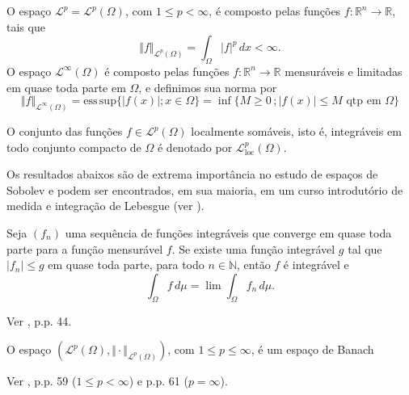 \documentclass[a4paper, 11pt]{book}
\theoremstyle{definition}
\newcommand{\bN}{\mathbb{N}}
\newcommand{\bR}{\mathbb{R}}
\newcommand{\cL}{\mathcal{L}}
\begin{document}
\begin{dbox}[Espaços $\cL^p$ e $\cL^\infty$]
    O espaço $\cL^p = \cL^p(\Omega)$, com $1 \leqslant p < \infty$, é composto pelas funções $f : \bR^n \to \bR$, tais que
    \[
        \Vert f \Vert_{\cL^p(\Omega)} = \int_\Omega |f|^p \, dx < \infty.
    \]
    O espaço $\cL^\infty(\Omega)$ é composto pelas funções $f : \bR^n \to \bR$ mensuráveis e limitadas em quase toda parte em $\Omega$, e definimos sua norma por
    \[
        \Vert f \Vert_{\cL^\infty(\Omega)} = \mathrm{ess\,sup} \{|f(x)|; x \in \Omega\} =\inf \{M \geqslant 0 \,; |f(x)| \leqslant M \text{ qtp em } \Omega\}
    \]
\end{dbox}

\begin{dbox}
    O conjunto das funções $f \in \cL^p(\Omega)$ localmente somáveis, isto é, integráveis em todo conjunto compacto de $\Omega$ é denotado por $\cL^p_{\mathrm{loc}}(\Omega)$.
\end{dbox}

Os resultados abaixos são de extrema importância no estudo de espaços de Sobolev e podem ser encontrados, em sua maioria, em um curso introdutório de medida e integração de Lebesgue (ver \cite{axler-measure.theory,bartle-measure.theory,folland-real.analysis}).

\begin{tbox} \label{thm:teorema-da-convergencia-dominada}
    Seja $(f_n)$ uma sequência de funções integráveis que converge em quase toda parte para a função mensurável $f$.
    Se existe uma função integrável $g$ tal que $|f_n| \leqslant g$ em quase toda parte, para todo $n \in \bN$, então $f$ é integrável e
    \[
        \int_\Omega f \,d\mu = \lim \int_\Omega f_n \,d\mu.
    \]
\end{tbox}
\begin{prf}
    Ver \cite{bartle-measure.theory}, p.p. 44.
\end{prf}

\begin{tbox} \label{thm:lp-completo-pre}
    O espaço $(\cL^p(\Omega), \Vert \cdot \Vert_{\cL^p(\Omega)})$, com $1 \leqslant p \leqslant \infty$, é um espaço de Banach\footnotemark
\end{tbox}
\begin{prf}
    Ver \cite{bartle-measure.theory}, p.p. 59 ($1 \leqslant p < \infty$) e p.p. 61 ($p = \infty$).
\end{prf}

\end{document}
